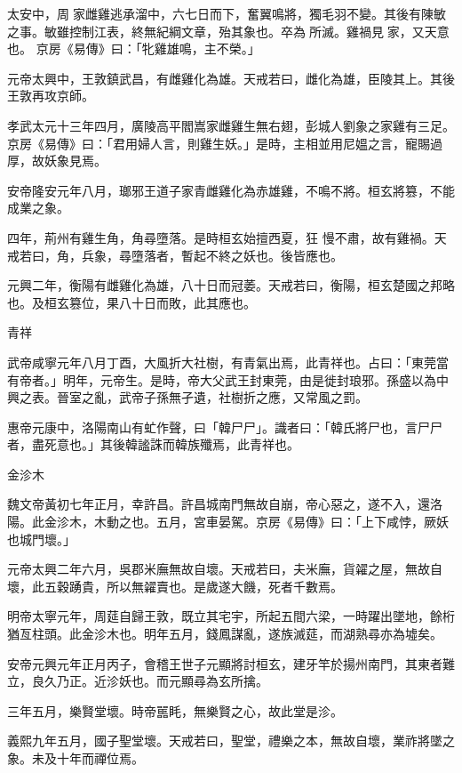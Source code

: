 \begin{pinyinscope}
 太安中，周家雌雞逃承溜中，六七日而下，奮翼鳴將，獨毛羽不變。其後有陳敏之事。敏雖控制江表，終無紀綱文章，殆其象也。卒為所滅。雞禍見家，又天意也。
 京房《易傳》曰：「牝雞雄鳴，主不榮。」



 元帝太興中，王敦鎮武昌，有雌雞化為雄。天戒若曰，雌化為雄，臣陵其上。其後王敦再攻京師。



 孝武太元十三年四月，廣陵高平閻嵩家雌雞生無右翅，彭城人劉象之家雞有三足。京房《易傳》曰：「君用婦人言，則雞生妖。」是時，主相並用尼媼之言，寵賜過厚，故妖象見焉。



 安帝隆安元年八月，瑯邪王道子家青雌雞化為赤雄雞，不鳴不將。桓玄將篡，不能成業之象。



 四年，荊州有雞生角，角尋墮落。是時桓玄始擅西夏，狂
 慢不肅，故有雞禍。天戒若曰，角，兵象，尋墮落者，暫起不終之妖也。後皆應也。



 元興二年，衡陽有雌雞化為雄，八十日而冠萎。天戒若曰，衡陽，桓玄楚國之邦略也。及桓玄篡位，果八十日而敗，此其應也。



 青祥



 武帝咸寧元年八月丁酉，大風折大社樹，有青氣出焉，此青祥也。占曰：「東莞當有帝者。」明年，元帝生。是時，帝大父武王封東莞，由是徙封琅邪。孫盛以為中興之表。晉室之亂，武帝子孫無孑遺，社樹折之應，又常風之罰。



 惠帝元康中，洛陽南山有虻作聲，曰「韓尸尸」。識者曰：「韓氏將尸也，言尸尸者，盡死意也。」其後韓謐誅而韓族殲焉，此青祥也。



 金沴木



 魏文帝黃初七年正月，幸許昌。許昌城南門無故自崩，帝心惡之，遂不入，還洛陽。此金沴木，木動之也。五月，宮車晏駕。京房《易傳》曰：「上下咸悖，厥妖也城門壞。」



 元帝太興二年六月，吳郡米廡無故自壞。天戒若曰，夫米廡，貨糴之屋，無故自壞，此五穀踴貴，所以無糴賣也。是歲遂大饑，死者千數焉。



 明帝太寧元年，周莚自歸王敦，既立其宅宇，所起五間六梁，一時躍出墜地，餘桁猶亙柱頭。此金沴木也。明年五月，錢鳳謀亂，遂族滅莚，而湖熟尋亦為墟矣。



 安帝元興元年正月丙子，會稽王世子元顯將討桓玄，建牙竿於揚州南門，其東者難立，良久乃正。近沴妖也。而元顯尋為玄所擒。



 三年五月，樂賢堂壞。時帝嚚眊，無樂賢之心，故此堂是沴。



 義熙九年五月，國子聖堂壞。天戒若曰，聖堂，禮樂之本，無故自壞，業祚將墜之象。未及十年而禪位焉。



\end{pinyinscope}